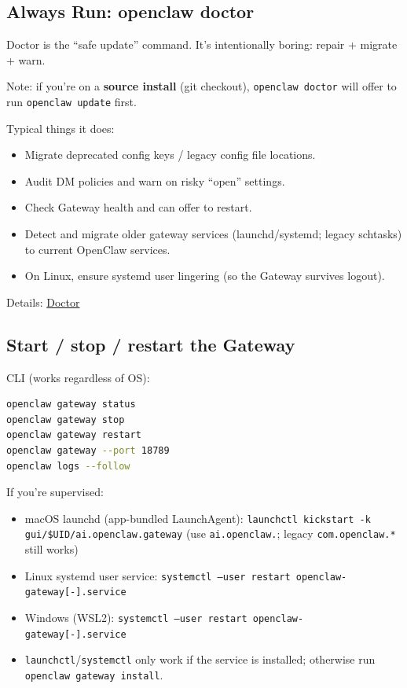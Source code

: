 \subsection{Always Run: openclaw doctor}


Doctor is the “safe update” command. It’s intentionally boring: repair + migrate + warn.

Note: if you’re on a \textbf{source install} (git checkout), \texttt{openclaw doctor} will offer to run \texttt{openclaw update} first.

Typical things it does:

\begin{itemize}
  \item Migrate deprecated config keys / legacy config file locations.
  \item Audit DM policies and warn on risky “open” settings.
  \item Check Gateway health and can offer to restart.
  \item Detect and migrate older gateway services (launchd/systemd; legacy schtasks) to current OpenClaw services.
  \item On Linux, ensure systemd user lingering (so the Gateway survives logout).
\end{itemize}


Details: \href{/gateway/doctor}{Doctor}

\subsection{Start / stop / restart the Gateway}


CLI (works regardless of OS):

\begin{lstlisting}[language=bash]
openclaw gateway status
openclaw gateway stop
openclaw gateway restart
openclaw gateway --port 18789
openclaw logs --follow
\end{lstlisting}


If you’re supervised:

\begin{itemize}
  \item macOS launchd (app-bundled LaunchAgent): \texttt{launchctl kickstart -k gui/\$UID/ai.openclaw.gateway} (use \texttt{ai.openclaw.}; legacy \texttt{com.openclaw.*} still works)
  \item Linux systemd user service: \texttt{systemctl --user restart openclaw-gateway[-].service}
  \item Windows (WSL2): \texttt{systemctl --user restart openclaw-gateway[-].service}
  \item \texttt{launchctl}/\texttt{systemctl} only work if the service is installed; otherwise run \texttt{openclaw gateway install}.
\end{itemize}


